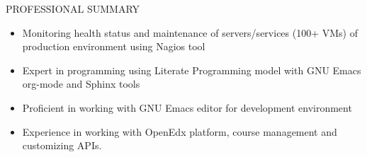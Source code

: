 \documentclass{resume} %
\begin{document}
\begin{rSection}{PROFESSIONAL SUMMARY}
\begin{itemize}
  \item Monitoring health status and maintenance of servers/services
    (100+ VMs) of production environment using Nagios tool

  \item Expert in programming using Literate Programming model with
    GNU Emacs org-mode and Sphinx tools

  \item Proficient in working with GNU Emacs editor for development
    environment
    
  \item Experience in working with OpenEdx platform, course
    management and customizing APIs.
    

  \end{itemize}

\end{rSection}

\end{document}
